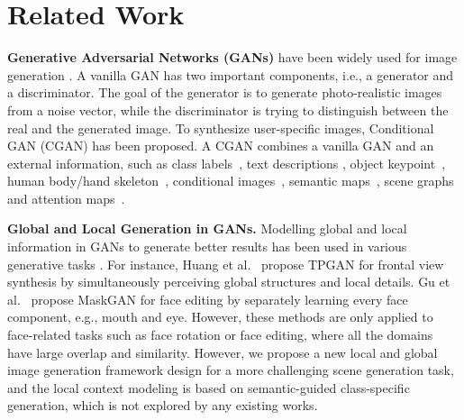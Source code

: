\documentclass[10pt,twocolumn,letterpaper]{article}
\begin{document}
 \section{Related Work}
\par\noindent\textbf{Generative Adversarial Networks (GANs)}
\cite{goodfellow2014generative} have been widely used for image generation \cite{karras2017progressive,zhang2018self,brock2018large,karras2018style,gulrajani2017improved,goetschalckx2019ganalyze,shocher2019ingan,liu2019few,shaham2019singan}.
A vanilla GAN has two important components, i.e., a generator and a discriminator. The goal of the generator is to generate photo-realistic images from a noise vector, while the discriminator is trying to distinguish between the real and the generated image. 
To synthesize user-specific images, Conditional GAN (CGAN) \cite{mirza2014conditional} has been proposed.
A CGAN combines a vanilla GAN and an external information, such as class labels~\cite{odena2016semi,odena2016conditional,choi2017stargan}, text descriptions \cite{li2019manigan,han2017stackgan,li2019controllable}, object keypoint~\cite{reed2016learning,tang2019cycle}, human body/hand skeleton~\cite{albahar2019guided,tang2018gesturegan,balakrishnan2018synthesizing,zhu2019progressive}, conditional images~\cite{zhu2017unpaired,isola2017image}, semantic maps~\cite{wang2018high,tang2019multi,park2019semantic,wang2018video}, scene graphs~\cite{johnson2018image,zhao2019image,ashual2019specifying} and attention maps~\cite{zhang2018self,mejjati2018unsupervised,tang2019attentiongan}.





\par\noindent\textbf{Global and Local Generation in GANs.}
Modelling global and local information in GANs to generate better results has been used in various generative tasks \cite{huang2017beyond,iizuka2017globally,lin2019coco,li2018global,qi2018global,gu2019mask}. 
For instance, Huang et al.~\cite{huang2017beyond} propose TPGAN for frontal view synthesis by simultaneously perceiving global structures and local details.
Gu et al.~\cite{gu2019mask} propose MaskGAN for face editing by separately learning every face component, e.g., mouth and eye.
However, these methods are only applied to face-related tasks such as face rotation or face editing, where all the domains have large  overlap and similarity.
However, we propose a new local and global image generation framework design for a more challenging scene generation task, and the local context modeling is based on semantic-guided class-specific generation, which is not explored by any existing works.
\end{document}
